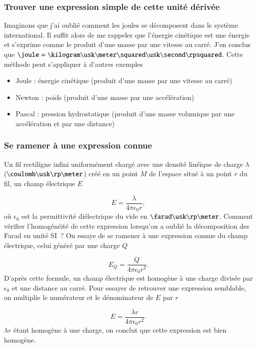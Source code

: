 \documentclass[12pt]{book}
\begin{document}
\subsubsection{Trouver une expression simple de cette unité dérivée}
Imaginons que j'ai oublié comment les joules se décomposent dans le système international.
Il suffit alors de me rappeler que l'énergie cinétique est une énergie et s'exprime
comme le produit d'une masse par une vitesse au carré. J'en conclus que 
$\joule = \kilogram \usk \meter \squared \usk \second \rpsquared$. Cette méthode 
peut s'appliquer à d'autres exemples
\begin{itemize}
	\item Joule : énergie cinétique (produit d'une masse par une vitesse au carré)
	\item Newton : poids (produit d'une masse par une accélération)
	\item Pascal : pression hydrostatique (produit d'une masse volumique par une accélération et par une distance)
\end{itemize}

\subsubsection{Se ramener à une expression connue}
Un fil rectiligne infini uniformément chargé avec une densité linéïque de charge
$\lambda$ ($\coulomb \usk \rp \meter$) créé en un point $M$ de l'espace
situé à un point $r$ du fil, un champ électrique $E$

\begin{equation*}
	E = \dfrac{\lambda}{4 \pi \epsilon_0 r},
\end{equation*}
où $\epsilon_0$ est la permittivité diélectrique du vide en 
$\farad \usk \rp \meter$. Comment vérifier l'homogénéité de cette expression
lorsqu'on a oublié la décomposition des Farad en unité SI~? On essaye de se 
ramener à une expression connue du champ électrique, celui généré par une charge 
$Q$

\begin{equation*}
	E_Q = \dfrac{Q}{4 \pi \epsilon_0 r^2}.
\end{equation*}
D'après cette formule, un champ électrique est homogène à une charge divisée 
par $\epsilon_0$ et une distance au carré. Pour essayer de retrouver une expression
semblable, on multiplie le numérateur et le dénominateur de $E$ par $r$

\begin{equation*}
	E = \dfrac{\lambda r}{4 \pi \epsilon_0 r^2}.
\end{equation*}
$\lambda r$ étant homogène à une charge, on conclut que cette expression est 
bien homogène.
\end{document}
